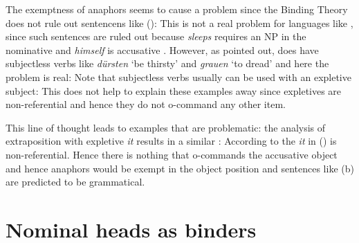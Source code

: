 \documentclass[output=paper
	        ,collection
	        ,collectionchapter
 	        ,biblatex
                ,babelshorthands
                ,newtxmath
                ,draftmode
                ,colorlinks, citecolor=brown
]{langscibook}
\begin{document}
The exemptness of anaphors seems to cause a problem since the Binding Theory does not rule out sentencens like ():
\z
This is not a real problem for languages like , since such sentences are ruled out because \emph{sleeps}
requires an NP in the nominative and \emph{himself} is accusative \parencites[]{Brame77}[]{ps2}.
However, as \citet[Section~20.4.6]{Mueller99a} pointed out,  does have subjectless verbs like \emph{dürsten} `be thirsty' and \emph{grauen} `to dread' and here the problem is real:
\eal
{}
\zl
Note that subjectless verbs usually can be used with an expletive subject:
\eal
{}
\zl
This does not help to explain these examples away since expletives are non-referential and hence
they do not o-command any other item. 

This line of thought leads to  examples that are problematic: the analysis of extraposition
with expletive \emph{it} results in a similar \argstl:
\eal
{}
\zl
According to \citet[]{ps2} the \emph{it} in () is non-referential. Hence there is
nothing that o-commands the accusative object and hence anaphors would be exempt in the object
position and sentences like (b) are predicted to be grammatical. 


\section{Nominal heads as binders}
\label{sec-nominal-heads-as-binders}
\end{document}
